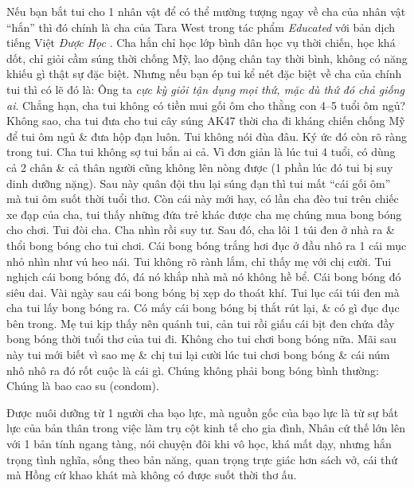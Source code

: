 \documentclass[12pt,oneside]{book}
\begin{document}
Nếu bạn bắt tui cho 1 nhân vật để có thể mường tượng ngay về cha của nhân vật ``hắn'' thì đó chính là cha của {\sc Tara West} trong tác phẩm {\it Educated} \cite{Westover_educated} với bản dịch tiếng Việt {\it Được Học} \cite{Westover_educated_VN}. Cha hắn chỉ học lớp bình dân học vụ thời chiến, học khá dốt, chỉ giỏi cầm súng thời chống Mỹ, lao động chân tay thời bình, không có năng khiếu gì thật sự đặc biệt. Nhưng nếu bạn ép tui kể nét đặc biệt về cha của chính tui thì có lẽ đó là: Ông ta {\it cực kỳ giỏi tận dụng mọi thứ, mặc dù thứ đó chả giống ai}. Chẳng hạn, cha tui không có tiền mui gối ôm cho thằng con 4--5 tuổi ôm ngủ? Không sao, cha tui đưa cho tui cây súng AK47 thời cha đi kháng chiến chống Mỹ để tui ôm ngủ \& đưa hộp đạn luôn. Tui không nói đùa đâu. Ký ức đó còn rõ ràng trong tui. Cha tui không sợ tui bắn ai cả. Vì đơn giản là lúc tui 4 tuổi, có dùng cả 2 chân \& cả thân người cũng không lên nòng được (1 phần lúc đó tui bị suy dinh dưỡng nặng). Sau này quân đội thu lại súng đạn thì tui mất ``cái gối ôm'' mà tui ôm suốt thời tuổi thơ. Còn cái này mới hay, có lần cha đèo tui trên chiếc xe đạp của cha, tui thấy những đứa trẻ khác được cha mẹ chúng mua bong bóng cho chơi. Tui đòi cha. Cha nhìn rồi suy tư. Sau đó, cha lôi 1 túi đen ở nhà ra \& thổi bong bóng cho tui chơi. Cái bong bóng trắng hơi đục ở đầu nhô ra 1 cái mục nhỏ nhìn như vú heo nái. Tui không rõ rành lắm, chỉ thấy mẹ với chị cười. Tui nghịch cái bong bóng đó, đá nó khắp nhà mà nó không hề bể. Cái bong bóng đó siêu dai. Vài ngày sau cái bong bóng bị xẹp do thoát khí. Tui lục cái túi đen mà cha tui lấy bong bóng ra. Có mấy cái bong bóng bị thắt rút lại, \& có gì đục đục bên trong. Mẹ tui kịp thấy nên quánh tui, cản tui rồi giấu cái bịt đen chứa đầy bong bóng thời tuổi thơ của tui đi. Không cho tui chơi bong bóng nữa. Mãi sau này tui mới biết vì sao mẹ \& chị tui lại cười lúc tui chơi bong bóng \& cái núm nhô nhô ra đó rốt cuộc là cái gì. Chúng không phải bong bóng bình thường: Chúng là bao cao su (condom).

Được nuôi dưỡng từ 1 người cha bạo lực, mà nguồn gốc của bạo lực là từ sự bất lực của bản thân trong việc làm trụ cột kinh tế cho gia đình, {\sf Nhân} cứ thế lớn lên với 1 bản tính ngang tàng, nói chuyện đôi khi vô học, khá mất dạy, nhưng hắn trọng tình nghĩa, sống theo bản năng, quan trọng trực giác hơn sách vở, cái thứ mà {\sf Hồng} cứ khao khát mà không có được suốt thời thơ ấu.
\end{document}
